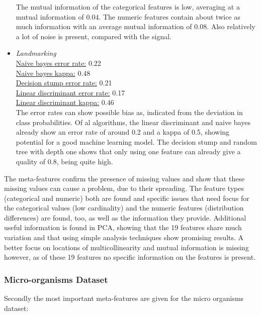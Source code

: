 \documentclass[10pt,a4paper]{report}
\begin{document}
\begin{itemize}
		The mutual information of the categorical features is low, averaging at a mutual information of $0.04$. The numeric features contain about twice as much information with an average mutual information of $0.08$. Also relatively a lot of noise is present, compared with the signal. 
		
		\item \textit{Landmarking} \\
		\underline{Naive bayes error rate:} 0.22 \\
		\underline{Naive bayes kappa:} 0.48 \\
		\underline{Decision stump error rate:} 0.21 \\
		\underline{Linear discriminant error rate:} 0.17 \\
		\underline{Linear discriminant kappa:} 0.46 \\  
		
		The error rates can show possible bias as, indicated from the deviation in class probabilities. Of al algorithms, the linear discriminant and naive bayes already show an error rate of around 0.2 and a kappa of 0.5, showing potential for a good machine learning model. The decision stump and random tree with depth one shows that only using one feature can already give a quality of 0.8, being quite high.
	\end{itemize}
	
	The meta-features confirm the presence of missing values and show that these missing values can cause a problem, due to their spreading. The feature types (categorical and numeric) both are found and specific issues that need focus for the categorical values (low cardinality) and the numeric features (distribution differences) are found, too, as well as the information they provide. Additional useful information is found in PCA, showing that the 19 features share much variation and that using simple analysis techniques show promising results. A better focus on locations of multicollinearity and mutual information is missing however, as of these 19 features no specific information on the features is present.
	
	\subsubsection{Micro-organisms Dataset}
	\label{DEsubsec:ExistingResultMO}
	
	Secondly the most important meta-features are given for the micro organisms dataset:
	
\end{document}
